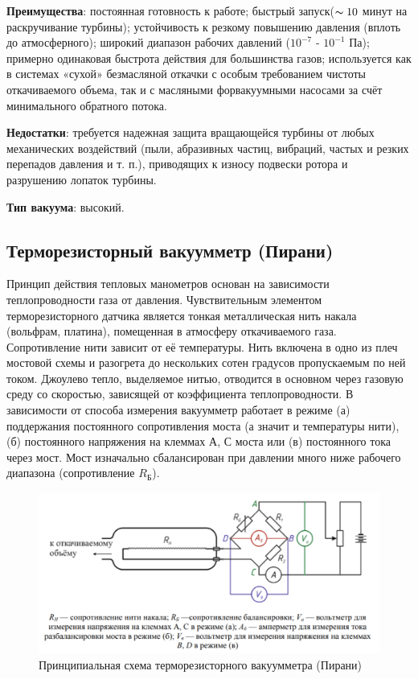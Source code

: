 \documentclass[a4paper,12pt]{article}
\begin{document}
\textbf{Преимущества}: постоянная готовность к работе; быстрый запуск($\thicksim 10$ минут на раскручивание турбины); устойчивость к резкому повышению давления (вплоть до атмосферного); широкий диапазон рабочих давлений ($10^{-7}$ - $10^{-1}$ Па); примерно одинаковая быстрота действия для большинства газов; используется как в системах «сухой» безмасляной откачки с особым требованием чистоты откачиваемого объема, так и с масляными форвакуумными насосами за счёт минимального обратного потока.

\textbf{Недостатки}: требуется надежная защита вращающейся турбины от любых механических воздействий (пыли, абразивных частиц, вибраций, частых и резких перепадов давления и т. п.), приводящих к износу подвески ротора и разрушению лопаток турбины.

\textbf{Тип вакуума}: высокий.


\subsection{Терморезисторный вакуумметр (Пирани)}

Принцип действия тепловых манометров основан на зависимости
теплопроводности газа от давления. Чувствительным элементом терморезисторного датчика является тонкая металлическая нить накала (вольфрам, платина), помещенная в атмосферу откачиваемого газа. Сопротивление нити зависит от её температуры. Нить включена в одно из плеч мостовой схемы и разогрета до нескольких сотен градусов пропускаемым по ней током. Джоулево тепло, выделяемое нитью, отводится в основном через газовую среду со скоростью, зависящей от коэффициента теплопроводности. В зависимости от способа измерения вакуумметр работает в режиме (а) поддержания постоянного сопротивления моста (а значит и температуры нити), (б) постоянного напряжения на клеммах $А$, $С$ моста или (в) постоянного тока через мост. Мост изначально сбалансирован при давлении много ниже рабочего диапазона (сопротивление $R_{\text{Б}}$).

\begin{figure}[h]
    \centering
    \includegraphics[width = 13 cm]{Пирани}
    \caption{Принципиальная схема терморезисторного вакуумметра (Пирани)}
    \label{fig:vac}
\end{figure}
\end{document}
